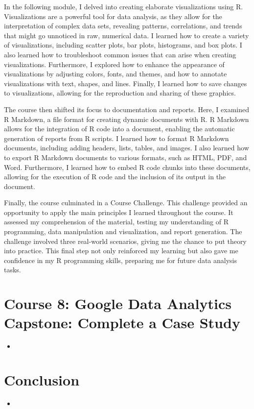 \documentclass[]{article}
\begin{document}
In the following module, I delved into creating elaborate visualizations using R. Visualizations are a powerful tool for data analysis, as they allow for the interpretation of complex data sets, revealing patterns, correlations, and trends that might go unnoticed in raw, numerical data. I learned how to create a variety of visualizations, including scatter plots, bar plots, histograms, and box plots. I also learned how to troubleshoot common issues that can arise when creating visualizations. Furthermore, I explored how to enhance the appearance of visualizations by adjusting colors, fonts, and themes, and how to annotate visualizations with text, shapes, and lines. Finally, I learned how to save changes to visualizations, allowing for the reproduction and sharing of these graphics.

The course then shifted its focus to documentation and reports. Here, I examined R Markdown, a file format for creating dynamic documents with R. R Markdown allows for the integration of R code into a document, enabling the automatic generation of reports from R scripts. I learned how to format R Markdown documents, including adding headers, lists, tables, and images. I also learned how to export R Markdown documents to various formats, such as HTML, PDF, and Word. Furthermore, I learned how to embed R code chunks into these documents, allowing for the execution of R code and the inclusion of its output in the document.

Finally, the course culminated in a Course Challenge. This challenge provided an opportunity to apply the main principles I learned throughout the course. It assessed my comprehension of the material, testing my understanding of R programming, data manipulation and visualization, and report generation. The challenge involved three real-world scenarios, giving me the chance to put theory into practice. This final step not only reinforced my learning but also gave me confidence in my R programming skills, preparing me for future data analysis tasks.

\section{Course 8: Google Data Analytics Capstone: Complete a Case Study}
\begin{itemize}
  \item
\end{itemize}
\section{Conclusion}
\begin{itemize}
  \item
\end{itemize}
\end{document}
